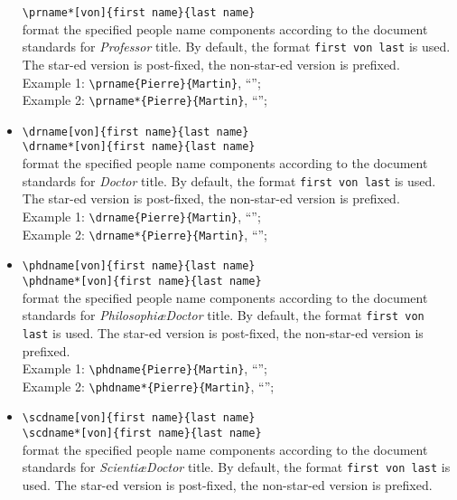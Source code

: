 \documentclass[book,taskpackage,specpackage,codepackage]{upmethodology-document}
\begin{document}
\begin{itemize}
      \texttt{{\textbackslash}prname*[von]\{first name\}\{last name\}} \\
	format the specified people name components according to the document standards for \emph{Professor} title. By default, the format \texttt{first von last} is used. The star-ed version is post-fixed, the non-star-ed version is prefixed. \\
	Example 1: \texttt{{\textbackslash}prname\{Pierre\}\{Martin\}}, ``''; \\
	Example 2: \texttt{{\textbackslash}prname*\{Pierre\}\{Martin\}}, ``'';
\item \texttt{{\textbackslash}drname[von]\{first name\}\{last name\}} \\
      \texttt{{\textbackslash}drname*[von]\{first name\}\{last name\}} \\
	format the specified people name components according to the document standards for \emph{Doctor} title. By default, the format \texttt{first von last} is used. The star-ed version is post-fixed, the non-star-ed version is prefixed. \\
	Example 1: \texttt{{\textbackslash}drname\{Pierre\}\{Martin\}}, ``''; \\
	Example 2: \texttt{{\textbackslash}drname*\{Pierre\}\{Martin\}}, ``'';
\item \texttt{{\textbackslash}phdname[von]\{first name\}\{last name\}} \\
      \texttt{{\textbackslash}phdname*[von]\{first name\}\{last name\}} \\
	format the specified people name components according to the document standards for \emph{Philosophi\ae Doctor} title. By default, the format \texttt{first von last} is used. The star-ed version is post-fixed, the non-star-ed version is prefixed. \\
	Example 1: \texttt{{\textbackslash}phdname\{Pierre\}\{Martin\}}, ``''; \\
	Example 2: \texttt{{\textbackslash}phdname*\{Pierre\}\{Martin\}}, ``'';
\item \texttt{{\textbackslash}scdname[von]\{first name\}\{last name\}} \\
      \texttt{{\textbackslash}scdname*[von]\{first name\}\{last name\}} \\
	format the specified people name components according to the document standards for \emph{Scienti\ae Doctor} title. By default, the format \texttt{first von last} is used. The star-ed version is post-fixed, the non-star-ed version is prefixed. \\

\end{itemize}
\end{document}

